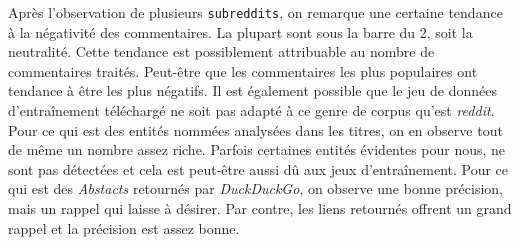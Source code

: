 \documentclass[12pt]{article}
\begin{document}
Après l'observation de plusieurs \verb;subreddits;, on remarque une certaine tendance à la négativité des commentaires. La plupart sont sous la barre du 2, soit la neutralité. Cette tendance est possiblement attribuable au nombre de commentaires traités. Peut-être que les commentaires les plus populaires ont tendance à être les plus négatifs. Il est également possible que le jeu de données d'entraînement téléchargé ne soit pas adapté à ce genre de corpus qu'est \textit{reddit}. Pour ce qui est des entités nommées analysées dans les titres, on en observe tout de même un nombre assez riche. Parfois certaines entités évidentes pour nous, ne sont pas détectées et cela est peut-être aussi dû aux jeux d'entraînement. Pour ce qui est des \textit{Abstacts} retournés par \textit{DuckDuckGo}, on observe une bonne précision, mais un rappel qui laisse à désirer. Par contre, les liens retournés offrent un grand rappel et la précision est assez bonne.

\end{document}
